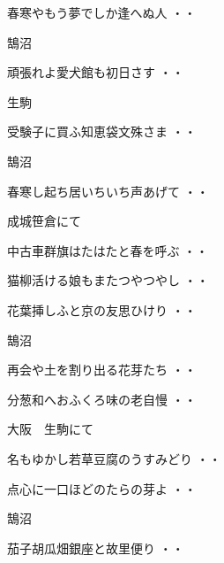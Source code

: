 \begin{shiika}春寒やもう夢でしか逢へぬ人
\hfill{・・}\end{shiika}
\vspace{0.6cm}
鵠沼
\begin{shiika}頑張れよ愛犬館も初日さす
\hfill{・・}\end{shiika}
\vspace{0.6cm}
生駒
\begin{shiika}受験子に買ふ知恵袋文殊さま
\hfill{・・}\end{shiika}
\vspace{0.6cm}
鵠沼
\begin{shiika}春寒し起ち居いちいち声あげて
\hfill{・・}\end{shiika}
\vspace{0.6cm}
成城笹倉にて
\begin{shiika}中古車群旗はたはたと春を呼ぶ
\hfill{・・}\end{shiika}
\begin{shiika}猫柳活ける娘もまたつやつやし
\hfill{・・}\end{shiika}
\begin{shiika}花葉挿しふと京の友思ひけり
\hfill{・・}\end{shiika}
\vspace{0.6cm}
鵠沼
\begin{shiika}再会や土を割り出る花芽たち
\hfill{・・}\end{shiika}
\begin{shiika}分葱和へおふくろ味の老自慢
\hfill{・・}\end{shiika}
\vspace{0.6cm}
大阪　生駒にて
\begin{shiika}名もゆかし若草豆腐のうすみどり
\hfill{・・}\end{shiika}
\begin{shiika}点心に一口ほどのたらの芽よ
\hfill{・・}\end{shiika}
\vspace{0.6cm}
鵠沼
\begin{shiika}茄子胡瓜畑銀座と故里便り
\hfill{・・}\end{shiika}
